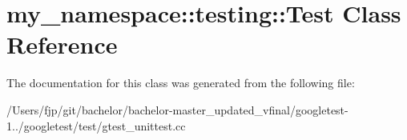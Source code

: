 \hypertarget{classmy__namespace_1_1testing_1_1_test}{}\section{my\+\_\+namespace\+:\+:testing\+:\+:Test Class Reference}
\label{classmy__namespace_1_1testing_1_1_test}


The documentation for this class was generated from the following file\+:\begin{DoxyCompactItemize}
\item 
/\+Users/fjp/git/bachelor/bachelor-\/master\+\_\+updated\+\_\+vfinal/googletest-\/1../googletest/test/gtest\+\_\+unittest.\+cc\end{DoxyCompactItemize}
